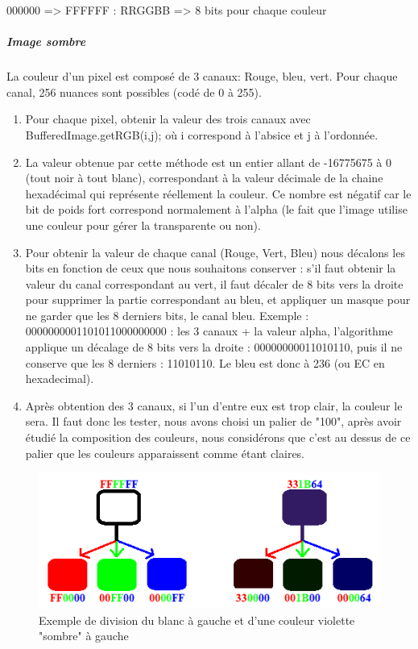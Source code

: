 	000000 => FFFFFF : RRGGBB => 8 bits pour chaque couleur
			\subparagraph{Image sombre}
				La couleur d'un pixel est composé de 3 canaux: Rouge, bleu, vert. Pour chaque canal, 256 nuances sont possibles (codé de 0 à 255).
				\begin{enumerate}
					\item Pour chaque pixel, obtenir la valeur des trois canaux avec BufferedImage.getRGB(i,j); où i correspond à l'absice et j à l'ordonnée. 
					\item La valeur obtenue par cette méthode est un entier allant de -16775675 à 0 (tout noir à tout blanc), correspondant à la valeur décimale de la chaine hexadécimal qui représente réellement la couleur. Ce nombre est négatif car le bit de poids fort correspond normalement à l'alpha (le fait que l'image utilise une couleur pour gérer la transparente ou non).
					\item Pour obtenir la valeur de chaque canal (Rouge, Vert, Bleu) nous décalons les bits en fonction de ceux que nous souhaitons conserver : s'il faut obtenir la valeur du canal correspondant au vert, il faut décaler de 8 bits vers la droite pour supprimer la partie correspondant au bleu, et appliquer un masque pour ne garder que les 8 derniers bits, le canal bleu. Exemple : 0000000001101011000000000 : les 3 canaux + la valeur alpha, l'algorithme applique un décalage de 8 bits vers la droite : 00000000011010110, puis il ne conserve que les 8 derniers : 11010110. Le bleu est donc à 236 (ou EC en hexadecimal).
					\item Après obtention des 3 canaux, si l'un d'entre eux est trop clair, la couleur le sera. Il faut donc les tester, nous avons choisi un palier de "100", après avoir étudié la composition des couleurs, nous considérons que c'est au dessus de ce palier que les couleurs apparaissent comme étant claires.
				\end{enumerate}
				\begin{figure}[!h]
					\centering
					\includegraphics{img/reasoningRGB.png}
					\caption{Exemple de division du blanc à gauche et d'une couleur violette "sombre" à gauche}
					\label{divisionRGB}
				\end{figure}
				
